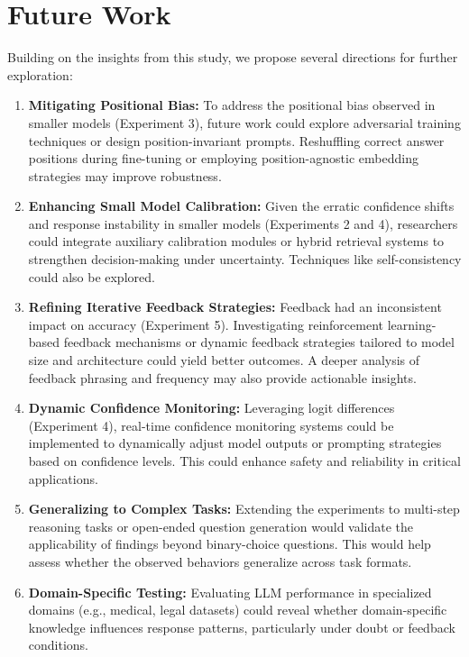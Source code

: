 \section{Future Work}

Building on the insights from this study, we propose several directions for further exploration:

\begin{enumerate}
  \item \textbf{Mitigating Positional Bias:} To address the positional bias observed in smaller models (Experiment 3), future work could explore adversarial training techniques or design position-invariant prompts. Reshuffling correct answer positions during fine-tuning or employing position-agnostic embedding strategies may improve robustness.

  \item \textbf{Enhancing Small Model Calibration:} Given the erratic confidence shifts and response instability in smaller models (Experiments 2 and 4), researchers could integrate auxiliary calibration modules or hybrid retrieval systems to strengthen decision-making under uncertainty. Techniques like self-consistency could also be explored.

  \item \textbf{Refining Iterative Feedback Strategies:} Feedback had an inconsistent impact on accuracy (Experiment 5). Investigating reinforcement learning-based feedback mechanisms or dynamic feedback strategies tailored to model size and architecture could yield better outcomes. A deeper analysis of feedback phrasing and frequency may also provide actionable insights.

  \item \textbf{Dynamic Confidence Monitoring:} Leveraging logit differences (Experiment 4), real-time confidence monitoring systems could be implemented to dynamically adjust model outputs or prompting strategies based on confidence levels. This could enhance safety and reliability in critical applications.

  \item \textbf{Generalizing to Complex Tasks:} Extending the experiments to multi-step reasoning tasks or open-ended question generation would validate the applicability of findings beyond binary-choice questions. This would help assess whether the observed behaviors generalize across task formats.

  \item \textbf{Domain-Specific Testing:} Evaluating LLM performance in specialized domains (e.g., medical, legal datasets) could reveal whether domain-specific knowledge influences response patterns, particularly under doubt or feedback conditions.


\end{enumerate}
